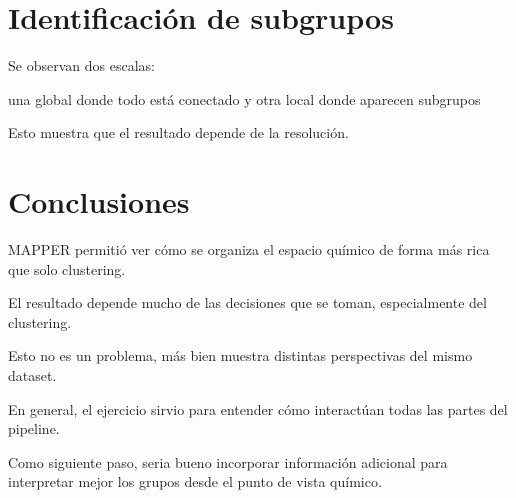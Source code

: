 \documentclass[12pt]{article}
\begin{document}
\section{Identificaci\'on de subgrupos}

Se observan dos escalas:

una global donde todo está conectado  
y otra local donde aparecen subgrupos

Esto muestra que el resultado depende de la resolución.

\section{Conclusiones}

MAPPER permitió ver cómo se organiza el espacio químico de forma más rica que solo clustering.

El resultado depende mucho de las decisiones que se toman, especialmente del clustering.

Esto no es un problema, más bien muestra distintas perspectivas del mismo dataset.

En general, el ejercicio sirvio para entender cómo interactúan todas las partes del pipeline.

Como siguiente paso, seria bueno incorporar información adicional para interpretar mejor los grupos desde el punto de vista químico.
\end{document}
